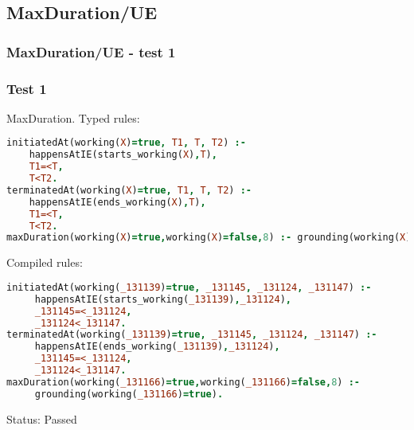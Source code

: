 \documentclass[8pt]{beamer}
\begin{document}
\subsection{MaxDuration/UE}
\begin{frame}[fragile]
\frametitle{MaxDuration/UE - test 1}
\subsubsection{Test 1}
\small
MaxDuration.\linebreak
Typed rules:
\begin{tiny}
\begin{lstlisting}[language=Prolog]
initiatedAt(working(X)=true, T1, T, T2) :-
    happensAtIE(starts_working(X),T),
    T1=<T,
    T<T2.
terminatedAt(working(X)=true, T1, T, T2) :-
    happensAtIE(ends_working(X),T),
    T1=<T,
    T<T2.
maxDuration(working(X)=true,working(X)=false,8) :- grounding(working(X)=true).
\end{lstlisting}
\end{tiny}
Compiled rules:
\begin{tiny}
\begin{lstlisting}[language=Prolog]
initiatedAt(working(_131139)=true, _131145, _131124, _131147) :-
     happensAtIE(starts_working(_131139),_131124),
     _131145=<_131124,
     _131124<_131147.
terminatedAt(working(_131139)=true, _131145, _131124, _131147) :-
     happensAtIE(ends_working(_131139),_131124),
     _131145=<_131124,
     _131124<_131147.
maxDuration(working(_131166)=true,working(_131166)=false,8) :- 
     grounding(working(_131166)=true).
\end{lstlisting}
\end{tiny}
Status: Passed
\end{frame}
\end{document}
